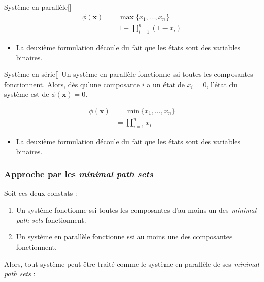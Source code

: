 \documentclass[french]{article}
\begin{document}
\begin{multicols*}{2}
\begin{definitionGENERAL}{Système en parallèle}[]
\begin{align*}
	\phi(\bm{x})
	&=	\max\{x_{1}, \dots, x_{n}\}		\\
	&=	1 - \prod_{i = 1}^{n} (1 - x_{i})
\end{align*}

\begin{itemize}
	\item	La deuxième formulation découle du fait que les états sont des variables binaires.
\end{itemize}
\end{definitionGENERAL}

\begin{definitionGENERAL}{Système en série}[]
Un système en parallèle fonctionne ssi toutes les composantes fonctionnent. Alors, dès qu'une composante $i$ a un état de $x_{i} = 0$, l'état du système est de $\phi(\bm{x}) = 0$.

\begin{align*}
	\phi(\bm{x})
	&=	\min\{x_{1}, \dots, x_{n}\}	\\
	&=	\prod_{i = 1}^{n} x_{i}
\end{align*}

\begin{itemize}
	\item	La deuxième formulation découle du fait que les états sont des variables binaires.
\end{itemize}
\end{definitionGENERAL}


\subsubsection{Approche par les \og \textit{minimal path sets} \fg{}}
Soit ces deux constats : 
\begin{enumerate}[label	=	\circled{\arabic*}{trueblue}]
	\item	Un système fonctionne ssi toutes les composantes d'au moins un des \og \textit{minimal path sets} \fg{} fonctionnent.
	\item	Un système en parallèle fonctionne ssi au moins une des composantes fonctionnent.
\end{enumerate}

Alors, tout système peut être traité comme le système en parallèle de ses \og \textit{minimal path sets} \fg{} :
\begin{center}
\begin{tikzpicture}[x=0.75pt,y=0.75pt,yscale=-1,xscale=1]


\end{tikzpicture}
\end{center}
\end{multicols*}
\end{document}

